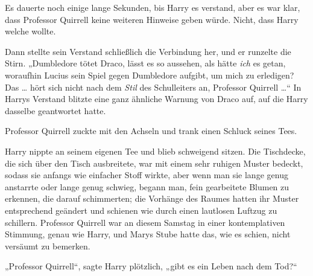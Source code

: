 Es dauerte noch einige lange Sekunden, bis Harry es verstand, aber es war klar, dass Professor Quirrell keine weiteren Hinweise geben würde. Nicht, dass Harry welche wollte.

Dann stellte sein Verstand schließlich die Verbindung her, und er runzelte die Stirn.
„Dumbledore tötet Draco, lässt es so aussehen, als hätte \emph{ich} es getan, woraufhin Lucius sein Spiel gegen Dumbledore aufgibt, um mich zu erledigen? Das … hört sich nicht nach dem \emph{Stil} des Schulleiters an, Professor Quirrell …“ In Harrys Verstand blitzte eine ganz ähnliche Warnung von Draco auf, auf die Harry dasselbe geantwortet hatte.

Professor Quirrell zuckte mit den Achseln und trank einen Schluck seines Tees.

Harry nippte an seinem eigenen Tee und blieb schweigend sitzen. Die Tischdecke, die sich über den Tisch ausbreitete, war mit einem sehr ruhigen Muster bedeckt, sodass sie anfangs wie einfacher Stoff wirkte, aber wenn man sie lange genug anstarrte oder lange genug schwieg, begann man, fein gearbeitete Blumen zu erkennen, die darauf schimmerten; die Vorhänge des Raumes hatten ihr Muster entsprechend geändert und schienen wie durch einen lautlosen Luftzug zu schillern. Professor Quirrell war an diesem Samstag in einer kontemplativen Stimmung, genau wie Harry, und Marys Stube hatte das, wie es schien, nicht versäumt zu bemerken.

„Professor Quirrell“, sagte Harry plötzlich, „gibt es ein Leben nach dem Tod?“

